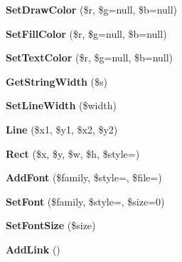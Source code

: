 \begin{DoxyCompactItemize}
\item 
\hypertarget{classFPDF_a2699cc6ff46c7cf2953e5e740f456d75}{}{\bfseries Set\+Draw\+Color} (\$r, \$g=null, \$b=null)\label{classFPDF_a2699cc6ff46c7cf2953e5e740f456d75}

\item 
\hypertarget{classFPDF_ac01941b00b99afca24dec97591665a3c}{}{\bfseries Set\+Fill\+Color} (\$r, \$g=null, \$b=null)\label{classFPDF_ac01941b00b99afca24dec97591665a3c}

\item 
\hypertarget{classFPDF_a59f12883ff2b60013eb0fe2c8c7e2dd5}{}{\bfseries Set\+Text\+Color} (\$r, \$g=null, \$b=null)\label{classFPDF_a59f12883ff2b60013eb0fe2c8c7e2dd5}

\item 
\hypertarget{classFPDF_a55c99f3416c3788c759249b6315c948a}{}{\bfseries Get\+String\+Width} (\$s)\label{classFPDF_a55c99f3416c3788c759249b6315c948a}

\item 
\hypertarget{classFPDF_ac8e8290a814b06303c1dfff06ee24acb}{}{\bfseries Set\+Line\+Width} (\$width)\label{classFPDF_ac8e8290a814b06303c1dfff06ee24acb}

\item 
\hypertarget{classFPDF_a408bfb653ed942e1e00d80ea9cdc139b}{}{\bfseries Line} (\$x1, \$y1, \$x2, \$y2)\label{classFPDF_a408bfb653ed942e1e00d80ea9cdc139b}

\item 
\hypertarget{classFPDF_af6b45f243c32ec04f1be28823b0cf15c}{}{\bfseries Rect} (\$x, \$y, \$w, \$h, \$style=\textquotesingle{}\textquotesingle{})\label{classFPDF_af6b45f243c32ec04f1be28823b0cf15c}

\item 
\hypertarget{classFPDF_a7bfe3e0ed15ed966d8c41e36fb16553c}{}{\bfseries Add\+Font} (\$family, \$style=\textquotesingle{}\textquotesingle{}, \$file=\textquotesingle{}\textquotesingle{})\label{classFPDF_a7bfe3e0ed15ed966d8c41e36fb16553c}

\item 
\hypertarget{classFPDF_a82acf7b1322a634829b56bb209045e1c}{}{\bfseries Set\+Font} (\$family, \$style=\textquotesingle{}\textquotesingle{}, \$size=0)\label{classFPDF_a82acf7b1322a634829b56bb209045e1c}

\item 
\hypertarget{classFPDF_a47d041deb672f69250c936a234eead14}{}{\bfseries Set\+Font\+Size} (\$size)\label{classFPDF_a47d041deb672f69250c936a234eead14}

\item 
\hypertarget{classFPDF_aa4784e97caa10d7b5bd5b37cdb8de523}{}{\bfseries Add\+Link} ()\label{classFPDF_aa4784e97caa10d7b5bd5b37cdb8de523}


\end{DoxyCompactItemize}
